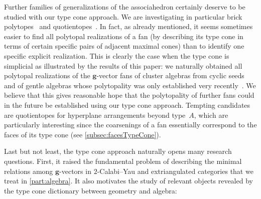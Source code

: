 \documentclass{amsart}
\theoremstyle{definition}
\renewcommand{\b}[1]{{\boldsymbol{#1}}} %
\begin{document}
\smallskip
Further families of generalizations of the associahedron certainly deserve to be studied with our type cone approach.
We are investigating in particular brick polytopes~\cite{PilaudSantos-brickPolytope, PilaudStump-brickPolytope} and quotientopes~\cite{Reading-latticeCongruences, Reading-CambrianLattices, PilaudSantos-quotientopes}.
In fact, as already mentioned, it seems sometimes easier to find all polytopal realizations of a fan (by describing its type cone in terms of certain specific pairs of adjacent maximal cones) than to identify one specific explicit realization.
This is clearly the case when the type cone is simplicial as illustrated by the results of this paper: we naturally obtained all polytopal realizations of the $\b{g}$-vector fans of cluster algebras from cyclic seeds and of gentle algebras whose polytopality was only established very recently~\cite{HohlwegPilaudStella, PaluPilaudPlamondon-nonkissing}.
We believe that this gives reasonable hope that the polytopality of further fans could in the future be established using our type cone approach.
Tempting candidates are quotientopes for hyperplane arrangements beyond type~$A$, which are particularly interesting since the coarsenings of a fan essentially correspond to the faces of its type cone (see \cref{subsec:facesTypeCone}).

\medskip
Last but not least, the type cone approach naturally opens many research questions.
First, it raised the fundamental problem of describing the minimal relations among $\b{g}$-vectors in $2$-Calabi--Yau and extriangulated categories that we treat in \cref{part:algebra}.
It also motivates the study of relevant objects revealed by the type cone dictionary between geometry and algebra:
\end{document}
